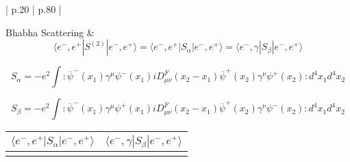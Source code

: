 \documentclass[a4]{article}
\begin{document}
\begin{longtable}{| p{} | p{} |}
        \hline

        Bhabha Scattering &
            \begin{equation}
                \langle e^{-}, e^{+} | S^{(2)} | e^{-}, e^{+}\rangle = \langle e^{-}, e^{+} | S_{\alpha} | e^{-}, e^{+} \rangle = \langle e^{-}, \gamma | S_{\beta} | e^{-}, e^{+} \rangle
            \end{equation}

            \begin{equation}
                S_{\alpha} = - e^{2} \int :\overline{\psi}^{-} (x_1) \gamma^{\mu} \psi^{-} (x_1) i D^{F}_{\mu \nu} (x_2 - x_1) \overline{\psi}^{+} (x_2) \gamma^{\nu} \psi^{+} (x_2): d^4 x_1 d^4 x_2
            \end{equation}

            \begin{equation}
                S_{\beta} = - e^{2} \int :\overline{\psi}^{-} (x_1) \gamma^{\mu} \psi^{+} (x_1) i D^{F}_{\mu \nu} (x_2 - x_1) \overline{\psi}^{+} (x_2) \gamma^{\nu} \psi^{-} (x_2): d^4 x_1 d^4 x_2
            \end{equation}

            \begin{center}
                \begin{tabular}{|c|c|}
                    \hline
                    $\langle e^{-}, e^{+} | S_{\alpha} | e^{-}, e^{+} \rangle$ & $\langle e^{-}, \gamma | S_{\beta} | e^{-}, e^{+} \rangle$ \\
                    \hline
                    \begin{tikzpicture}
                        \begin{feynman}
                            \vertex [label = right: $x_1$] (a);
                            \vertex [below = of a, label = left: $x_2$] (b);
                            \vertex [above right = of a, label = $e^{+}$] (c);
                            \vertex [above left = of a, label = $e^{-}$] (d);
                            \vertex [below left = of b, label = $e^{-}$] (e);
                            \vertex [below right = of b, label = $e^{+}$] (f);
            

\end{feynman}
\end{tikzpicture}
\end{tabular}
\end{center}
\end{longtable}
\end{document}
